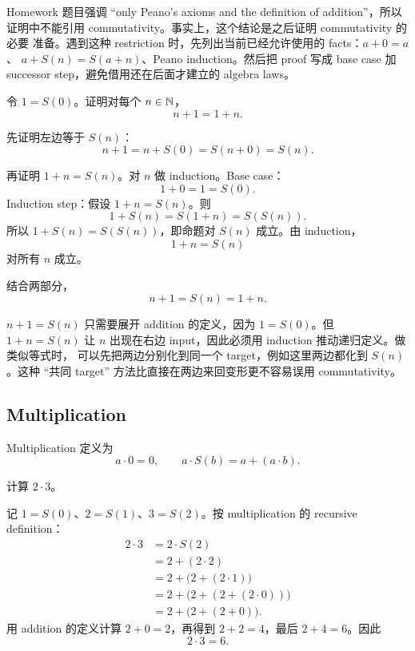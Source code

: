 \begin{explanation}
Homework 题目强调 ``only Peano's axioms and the definition of addition''，所以
证明中不能引用 commutativity。事实上，这个结论是之后证明 commutativity 的必要
准备。遇到这种 restriction 时，先列出当前已经允许使用的 facts：\(a+0=a\)、
\(a+S(n)=S(a+n)\)、Peano induction。然后把 proof 写成 base case 加 successor
step，避免借用还在后面才建立的 algebra laws。
\end{explanation}

\begin{exerciseblock}
令 \(1=S(0)\)。证明对每个 \(n\in\mathbb{N}\)，
\[
  n+1=1+n.
\]
\end{exerciseblock}

\begin{solution}
先证明左边等于 \(S(n)\)：
\[
  n+1=n+S(0)=S(n+0)=S(n).
\]

再证明 \(1+n=S(n)\)。对 \(n\) 做 induction。Base case：
\[
  1+0=1=S(0).
\]
Induction step：假设 \(1+n=S(n)\)。则
\[
  1+S(n)=S(1+n)=S(S(n)).
\]
所以 \(1+S(n)=S(S(n))\)，即命题对 \(S(n)\) 成立。由 induction，
\[
  1+n=S(n)
\]
对所有 \(n\) 成立。

结合两部分，
\[
  n+1=S(n)=1+n.
\]
\end{solution}

\begin{explanation}
\(n+1=S(n)\) 只需要展开 addition 的定义，因为 \(1=S(0)\)。但 \(1+n=S(n)\)
让 \(n\) 出现在右边 input，因此必须用 induction 推动递归定义。做类似等式时，
可以先把两边分别化到同一个 target，例如这里两边都化到 \(S(n)\)。这种 ``共同
target'' 方法比直接在两边来回变形更不容易误用 commutativity。
\end{explanation}

\subsection{Multiplication}

Multiplication 定义为
\[
  a\cdot0=0,\qquad a\cdot S(b)=a+(a\cdot b).
\]

\begin{exerciseblock}
计算 \(2\cdot3\)。
\end{exerciseblock}

\begin{solution}
记 \(1=S(0)\)、\(2=S(1)\)、\(3=S(2)\)。按 multiplication 的 recursive
definition：
\[
\begin{aligned}
2\cdot3
  &=2\cdot S(2)\\
  &=2+(2\cdot2)\\
  &=2+\bigl(2+(2\cdot1)\bigr)\\
  &=2+\bigl(2+(2+(2\cdot0))\bigr)\\
  &=2+\bigl(2+(2+0)\bigr).
\end{aligned}
\]
用 addition 的定义计算 \(2+0=2\)，再得到 \(2+2=4\)，最后 \(2+4=6\)。因此
\[
  2\cdot3=6.
\]
\end{solution}

